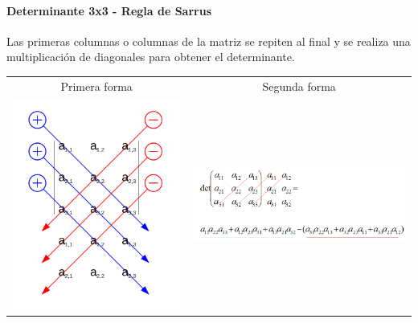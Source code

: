 \documentclass[stu, 12pt, letterpaper, donotrepeattitle, floatsintext, natbib]{apa7}
\begin{document}
    \paragraph{Determinante 3x3 - Regla de Sarrus}
    Las primeras columnas o columnas de la matriz se repiten al final y se realiza una multiplicación de diagonales para obtener el determinante.\\
    \begin{table}
        \label{tab:sarrus}
        \begin{tabular}{cc}

            Primera forma & Segunda forma \\
            \includegraphics[scale=0.25]{sarrus}
            &
            \includegraphics[scale=0.5]{sarrus2}

        \end{tabular}
    \end{table}
\end{document}
